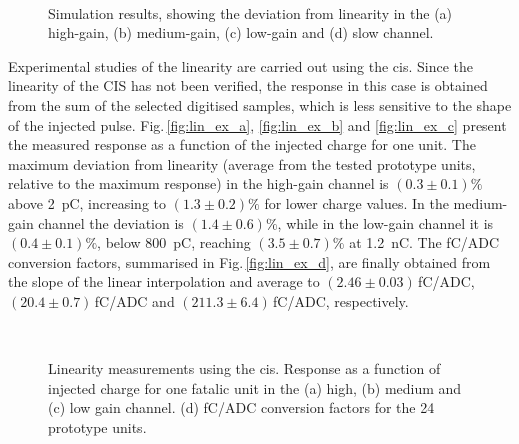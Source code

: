 \begin{figure}[!tbh]
  \centering
  \\
  \caption{Simulation results, showing the deviation from linearity in the (a) high-gain, (b) medium-gain, 
           (c) low-gain and (d) slow channel.\label{fig:glin}}
\end{figure}

Experimental studies of the linearity are carried out using the \gls{cis}. Since the linearity of the CIS has not been
verified, the response in this case is obtained from the sum of the selected digitised samples, which is less sensitive 
to the shape of the injected pulse. Fig.\,\ref{fig:lin_ex_a}, \ref{fig:lin_ex_b} and \ref{fig:lin_ex_c} present the measured response 
as a function of the injected charge for one unit. The maximum deviation from linearity (average from the tested prototype 
units, relative to the maximum response) in the high-gain channel is $(0.3\pm 0.1)\%$ above \SI{2}{pC}, increasing to 
$(1.3\pm 0.2)\%$ for lower charge values. In the medium-gain channel the deviation is $(1.4\pm 0.6)\%$, while in the low-gain 
channel it is $(0.4\pm 0.1)\%$, below \SI{800}{pC}, reaching $(3.5\pm 0.7)\%$ at \SI{1.2}{nC}. The fC/ADC conversion factors, 
summarised in Fig.\,\ref{fig:lin_ex_d}, are finally obtained from the slope of the linear interpolation and average to 
$(2.46 \pm 0.03)$\,fC/ADC, $(20.4 \pm 0.7)$\,fC/ADC and $(211.3 \pm 6.4)$\,fC/ADC, respectively.

\begin{figure}[!tbh]
  \centering
  \\
  \caption{ Linearity measurements using the \gls{cis}. Response as a function of injected charge for one \gls{fatalic} unit
            in the (a) high, (b) medium and (c) low gain channel. (d) fC/ADC conversion factors for the 24 prototype units.
            \label{fig:lin_ex}}
\end{figure}

